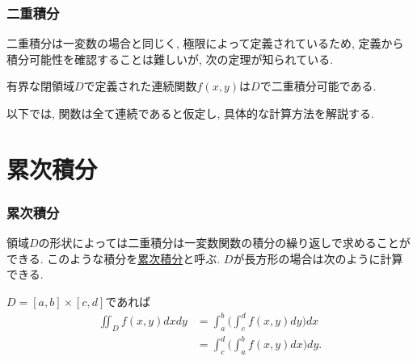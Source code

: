 

\begin{frame}
\frametitle{二重積分}

二重積分は一変数の場合と同じく, 極限によって定義されているため, 
定義から積分可能性を確認することは難しいが, 次の定理が知られている. 

\begin{Thm}
有界な閉領域$D$で定義された連続関数$f(x,y)$は$D$で二重積分可能である. 
\end{Thm}

以下では, 関数は全て連続であると仮定し, 具体的な計算方法を解説する. 

\end{frame}


\section{累次積分}


\begin{frame}
\frametitle{累次積分}


領域$D$の形状によっては二重積分は一変数関数の積分の繰り返しで求めることができる. 
このような積分を\underline{累次積分}と呼ぶ. 
$D$が長方形の場合は次のように計算できる.  


\begin{Thm}
$D=[a,b]\times [c,d]$であれば
\begin{align*}
\iint_Df(x,y)dxdy &= \int_a^b\big( \int_c^d f(x,y)dy\big)dx \\
& = \int_c^d\big( \int_a^b f(x,y)dx\big)dy.
\end{align*}
\end{Thm}

\end{frame}





